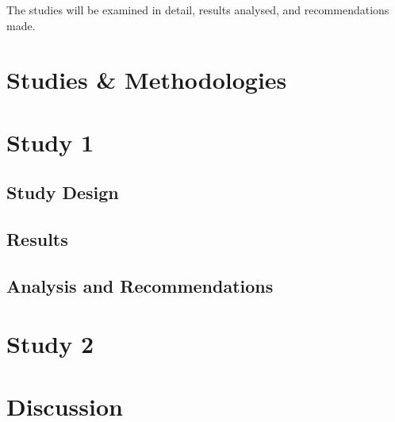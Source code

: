 The studies will be examined in detail, results analysed, and recommendations made.  





\section{Studies \& Methodologies\label{Hardware:Studies and Methodologies}}








\section{Study 1\label{Hardware:Study 1}}
\subsection{Study Design}


\subsection{Results}



\subsection{Analysis and Recommendations}







\section{Study 2\label{Hardware:Study 2}}













\section{Discussion\label{Hardware:Discussion}}









